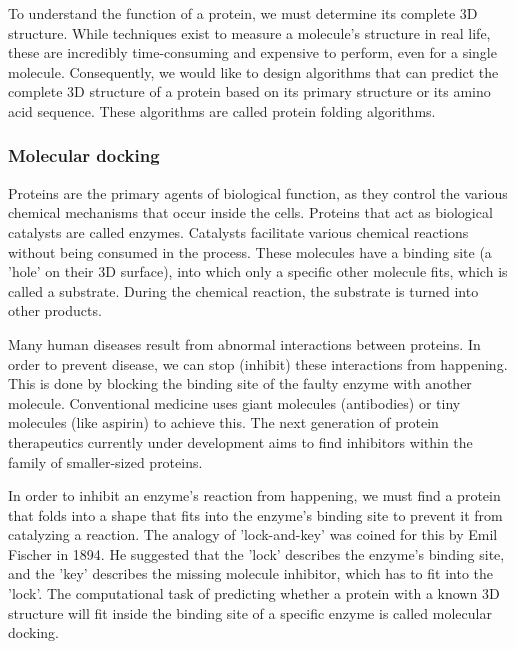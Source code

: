 To understand the function of a protein, we must determine its complete 3D structure. While techniques exist to measure a molecule's structure in real life, these are incredibly time-consuming and expensive to perform, even for a single molecule. Consequently, we would like to design algorithms that can predict the complete 3D structure of a protein based on its primary structure or its amino acid sequence. These algorithms are called protein folding algorithms.

\subsubsection{Molecular docking}

Proteins are the primary agents of biological function, as they control the various chemical mechanisms that occur inside the cells. Proteins that act as biological catalysts are called enzymes. Catalysts facilitate various chemical reactions without being consumed in the process. These molecules have a binding site (a 'hole' on their 3D surface), into which only a specific other molecule fits, which is called a substrate. During the chemical reaction, the substrate is turned into other products.  \cite{fionda_networks_2019}

Many human diseases result from abnormal interactions between proteins. In order to prevent disease, we can stop (inhibit) these interactions from happening. This is done by blocking the binding site of the faulty enzyme with another molecule. Conventional medicine uses giant molecules (antibodies) or tiny molecules (like aspirin) to achieve this. The next generation of protein therapeutics currently under development aims to find inhibitors within the family of smaller-sized proteins.
 \cite{ryan_proteinprotein_2005}

In order to inhibit an enzyme's reaction from happening, we must find a protein that folds into a shape that fits into the enzyme's binding site to prevent it from catalyzing a reaction. The analogy of 'lock-and-key' was coined for this by Emil Fischer in 1894. He suggested that the 'lock' describes the enzyme's binding site, and the 'key' describes the missing molecule inhibitor, which has to fit into the 'lock'. \cite{a_molecular_2018} \cite{walker_molecular_2008} The computational task of predicting whether a protein with a known 3D structure will fit inside the binding site of a specific enzyme is called molecular docking.


